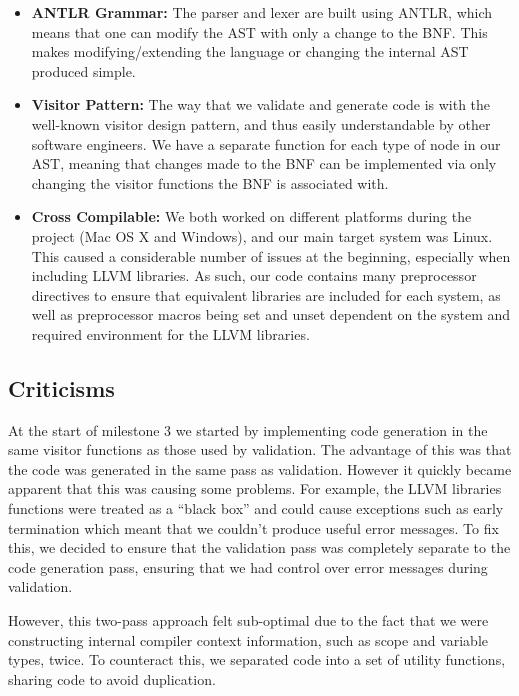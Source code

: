 \documentclass[a4wide, 11pt]{article}
\begin{document}
\begin{itemize}
\item
\textbf{ANTLR Grammar:} The parser and lexer are built using ANTLR, which means that one can modify the AST with only a change to the BNF. This makes modifying/extending the language or changing the internal AST produced simple.
\item
\textbf{Visitor Pattern:} The way that we validate and generate code is with the well-known visitor design pattern, and thus easily understandable by other software engineers. We have a separate function for each type of node in our AST, meaning that changes made to the BNF can be implemented via only changing the visitor functions the BNF is associated with.
\item
\textbf{Cross Compilable:} We both worked on different platforms during the project (Mac OS X and Windows), and our main target system was Linux. This caused a considerable number of issues at the beginning, especially when including LLVM libraries. As such, our code contains many preprocessor directives to ensure that equivalent libraries are included for each system, as well as preprocessor macros being set and unset dependent on the system and required environment for the LLVM libraries.
\end{itemize}

\subsection{Criticisms}

At the start of milestone 3 we started by implementing code generation in the same visitor functions as those used by validation. The advantage of this was that the code was generated in the same pass as validation. However it quickly became apparent that this was causing some problems. For example, the LLVM libraries functions were treated as a ``black box'' and could cause exceptions such as early termination which meant that we couldn't produce useful error messages. To fix this, we decided to ensure that the validation pass was completely separate to the code generation pass, ensuring that we had control over error messages during validation.

However, this two-pass approach felt sub-optimal due to the fact that we were constructing internal compiler context information, such as scope and variable types, twice. To counteract this, we separated code into a set of utility functions, sharing code to avoid duplication.
\end{document}
